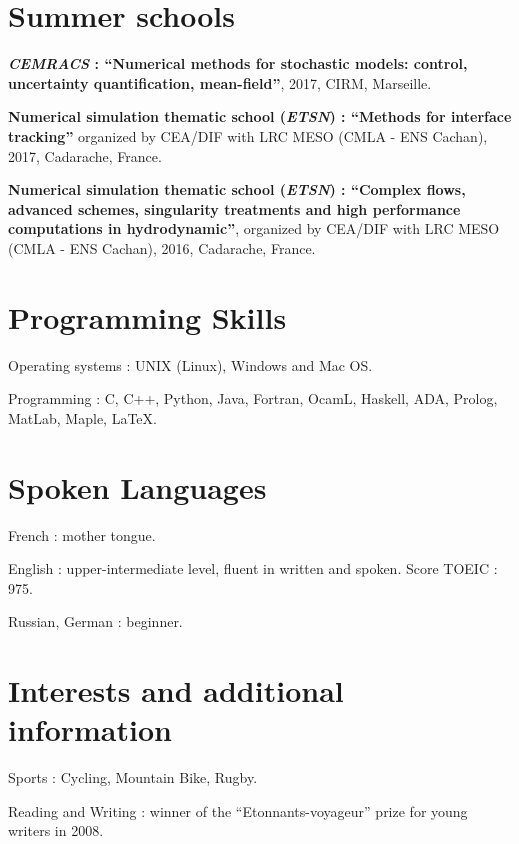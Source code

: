 \documentclass{article}
\renewenvironment{itemize}{
  \begin{list}{}{
      \setlength{\leftmargin}{1.5em}
      \setlength{\itemsep}{0.25em}
      \setlength{\parskip}{0pt}
      \setlength{\parsep}{0.25em}
    }
}{
  \end{list}
}
\begin{document}
\section*{Summer schools}
\begin{itemize}
	\item \textbf{\textit{CEMRACS} : ``Numerical methods for stochastic models: control, uncertainty quantification, mean-field''}, 2017, CIRM, Marseille.
	\item \textbf{Numerical simulation thematic school (\textit{ETSN}) : ``Methods for interface tracking''} organized by CEA/DIF with LRC MESO (CMLA - ENS Cachan), 2017, Cadarache, France.
	\item \textbf{Numerical simulation thematic school (\textit{ETSN}) : ``Complex flows, advanced schemes, singularity treatments and high performance computations in hydrodynamic''}, organized by CEA/DIF with LRC MESO (CMLA - ENS Cachan), 2016, Cadarache, France.
\end{itemize}  

\section*{Programming Skills}
\begin{itemize}
	\item Operating systems : UNIX (Linux), Windows and Mac OS.
	\item Programming : C, C++, Python, Java, Fortran, OcamL, Haskell, ADA, Prolog, MatLab, Maple, \LaTeX. 
\end{itemize}  

\section*{Spoken Languages}
\begin{itemize}
	\item French : mother tongue.
	\item English : upper-intermediate level, fluent in written and spoken. Score TOEIC : 975.
	\item Russian, German : beginner.
\end{itemize}
\section*{Interests and additional information}
\begin{itemize}
	\item Sports : Cycling, Mountain Bike, Rugby.
	\item Reading and Writing : winner of the ``Etonnants-voyageur'' prize for young writers in 2008.
\end{itemize}  
\end{document}
